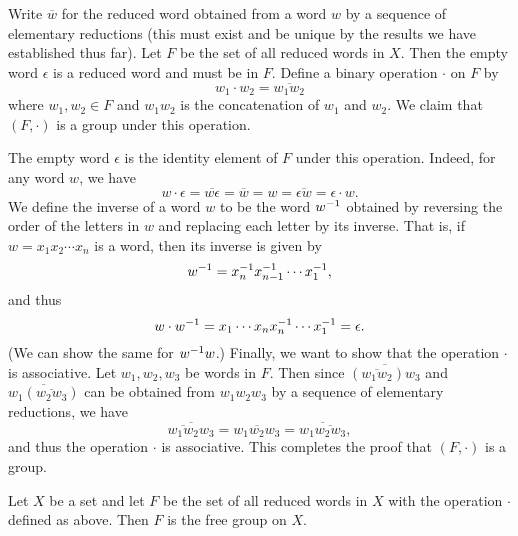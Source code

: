 Write \(\overline{w}\) for the reduced word obtained from a word \(w\) by a
sequence of elementary reductions (this must exist and be unique by the results
we have established thus far). Let \(F\) be the set of all reduced words in
\(X\). Then the empty word \(\epsilon\) is a reduced word and must be in \(F\).
Define a binary operation \(\cdot\) on \(F\) by
\[
    w_1 \cdot w_2 = \overline{w_1 w_2}
\]
where \(w_1, w_2 \in F\) and \(w_1 w_2\) is the concatenation of \(w_1\) and
\(w_2\). We claim that \((F, \cdot)\) is a group under this operation.

The empty word \(\epsilon\) is the identity element of \(F\) under this
operation. Indeed, for any word \(w\), we have
\[
    w \cdot \epsilon = \overline{w \epsilon} = \overline{w} = w = \overline{\epsilon w} = \epsilon \cdot w.
\]
We define the inverse of a word \(w\) to be the word \(w^{-1}\) obtained by
reversing the order of the letters in \(w\) and replacing each letter by its
inverse. That is, if \(w = x_1 x_2 \cdots x_n\) is a word, then its inverse is
given by
\[
    w^{-1} = x_n^{-1} x_{n - 1}^{-1} \cdots x_1^{-1},
\]
and thus
\[
    w \cdot w^{-1} = x_1 \cdots x_n x_n^{-1} \cdots x_1^{-1} = \epsilon.
\]
(We can show the same for \(w^{-1} w\).) Finally, we want to show that the
operation \(\cdot\) is associative. Let \(w_1, w_2, w_3\) be words in \(F\).
Then since \(\overline{(\overline{w_1 w_2})w_3}\) and
\(\overline{w_1(\overline{w_2 w_3})}\) can be obtained from \(w_1 w_2 w_3\) by a
sequence of elementary reductions, we have
\[
    \overline{\overline{w_1 w_2} w_3} = \overline{w_1 w_2 w_3} = \overline{w_1 \overline{w_2 w_3}},
\]
and thus the operation \(\cdot\) is associative. This completes the proof that
\((F, \cdot)\) is a group.

\begin{theorem}
    Let \(X\) be a set and let \(F\) be the set of all reduced words in \(X\)
    with the operation \(\cdot\) defined as above. Then \(F\) is the free group
    on \(X\). 
\end{theorem}

